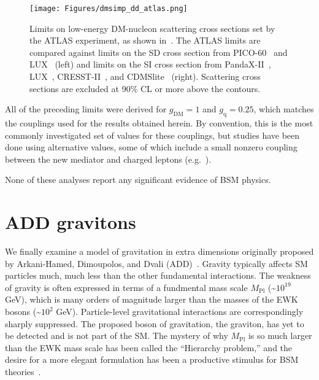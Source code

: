 \begin{figure}[hbtb]
  \begin{center}
    \texttt{[image: Figures/dmsimp\_dd\_atlas.png]}
    \caption{Limits on low-energy DM-nucleon scattering cross sections set by the ATLAS experiment, as shown in~\cite{ref:epjc/s10052-017-4965-8}. The ATLAS
    limits are compared against limits on the SD cross section from PICO-60~\cite{ref:PICO60-ATLAS} and LUX~\cite{ref:LUX-SD-ATLAS} (left)
    and limits on the SI cross section from PandaX-II~\cite{ref:PANDAX-II-ATLAS}, LUX~\cite{ref:LUX-SI-ATLAS}, CRESST-II~\cite{ref:CRESST-II-ATLAS}, and CDMSlite~\cite{ref:SuperCDMS-ATLAS} (right).
    Scattering cross sections are excluded at 90\% CL or more above the contours.
    }
    \label{fig:dmsimp_dd_atlas}
  \end{center}
\end{figure}

All of the preceding limits were derived for $g_\mathrm{DM} = 1$ and $g_\mathrm{q} = 0.25$, which matches the couplings used for the results obtained herein.
By convention, this is the most commonly investigated set of values for these couplings, but studies have been done using alternative values, some of which
include a small nonzero coupling between the new mediator and charged leptons (e.g.~\cite{ref:epjc/s10052-017-4965-8}).

None of these analyses report any significant evidence of BSM physics.

\section{ADD gravitons} \label{sec:introduction_ADD}
We finally examine a model of gravitation in extra dimensions originally proposed by Arkani-Hamed, Dimoupolos, and Dvali (ADD)~\cite{ref:S0370-2693(98)00466-3}.
Gravity typically affects SM particles much, much less than the other fundamental interactions. The weakness of gravity
is often expressed in terms of a fundmental mass scale $M_\mathrm{Pl}$ (\textasciitilde$10^{19}$ GeV), which is
many orders of magnitude larger than the masses of the EWK bosons (\textasciitilde$10^{2}$ GeV). Particle-level gravitational interactions
are correspondingly sharply suppressed. The proposed boson of gravitation, the graviton, has yet to be detected and is not part of the SM.
The mystery of why $M_\mathrm{Pl}$ is so much larger than the EWK mass scale has been called the ``Hierarchy problem,'' and the desire for a
more elegant formulation has been a productive stimulus for BSM theories~\cite{ref:S0370-2693(98)00466-3, ref:0264-9381/32/3/033001}.


